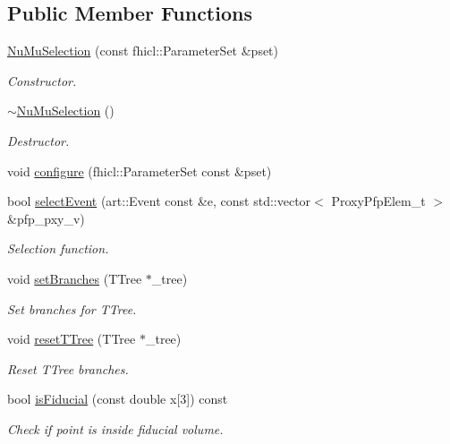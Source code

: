 \subsection*{Public Member Functions}
\begin{DoxyCompactItemize}
\item 
\hyperlink{classselection_1_1NuMuSelection_a6c36dee1cdd9d72715fd43325dfdd585}{Nu\-Mu\-Selection} (const fhicl\-::\-Parameter\-Set \&pset)
\begin{DoxyCompactList}\small\item\em Constructor. \end{DoxyCompactList}\item 
\hypertarget{classselection_1_1NuMuSelection_af2a4b263e268fc51f0fa58ea4ad74ee4}{\hyperlink{classselection_1_1NuMuSelection_af2a4b263e268fc51f0fa58ea4ad74ee4}{$\sim$\-Nu\-Mu\-Selection} ()}\label{classselection_1_1NuMuSelection_af2a4b263e268fc51f0fa58ea4ad74ee4}

\begin{DoxyCompactList}\small\item\em Destructor. \end{DoxyCompactList}\item 
void \hyperlink{classselection_1_1NuMuSelection_a81a56e38f0c105c5ef34a3c777c2ff1d}{configure} (fhicl\-::\-Parameter\-Set const \&pset)
\item 
bool \hyperlink{classselection_1_1NuMuSelection_ad9aaf5eedf311e33cb6e7f54e2605c98}{select\-Event} (art\-::\-Event const \&e, const std\-::vector$<$ Proxy\-Pfp\-Elem\-\_\-t $>$ \&pfp\-\_\-pxy\-\_\-v)
\begin{DoxyCompactList}\small\item\em Selection function. \end{DoxyCompactList}\item 
void \hyperlink{classselection_1_1NuMuSelection_ac8305341911433f5e08ee705280199d4}{set\-Branches} (T\-Tree $\ast$\-\_\-tree)
\begin{DoxyCompactList}\small\item\em Set branches for T\-Tree. \end{DoxyCompactList}\item 
void \hyperlink{classselection_1_1NuMuSelection_a18b4df2675c0622cb5fbe00711350328}{reset\-T\-Tree} (T\-Tree $\ast$\-\_\-tree)
\begin{DoxyCompactList}\small\item\em Reset T\-Tree branches. \end{DoxyCompactList}\item 
bool \hyperlink{classselection_1_1NuMuSelection_a8d363b7e57166d4711020245db1b73b1}{is\-Fiducial} (const double x\mbox{[}3\mbox{]}) const 
\begin{DoxyCompactList}\small\item\em Check if point is inside fiducial volume. \end{DoxyCompactList}\end{DoxyCompactItemize}
